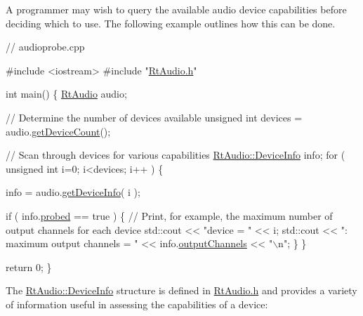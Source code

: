 A programmer may wish to query the available audio device capabilities before deciding which to use. The following example outlines how this can be done.


\begin{DoxyCode}
\textcolor{comment}{// audioprobe.cpp}

\textcolor{preprocessor}{#include <iostream>}
\textcolor{preprocessor}{#include "\hyperlink{_rt_audio_8h}{RtAudio.h}"}

\textcolor{keywordtype}{int} main()
\{
  \hyperlink{class_rt_audio}{RtAudio} audio;

  \textcolor{comment}{// Determine the number of devices available}
  \textcolor{keywordtype}{unsigned} \textcolor{keywordtype}{int} devices = audio.\hyperlink{class_rt_audio_a747ce2d73803641bbb66d6e78092aa1a}{getDeviceCount}();

  \textcolor{comment}{// Scan through devices for various capabilities}
  \hyperlink{struct_rt_audio_1_1_device_info}{RtAudio::DeviceInfo} info;
  \textcolor{keywordflow}{for} ( \textcolor{keywordtype}{unsigned} \textcolor{keywordtype}{int} i=0; i<devices; i++ ) \{

    info = audio.\hyperlink{class_rt_audio_a02d7ff44ad1d7eae22283a052f3dfda8}{getDeviceInfo}( i );

    \textcolor{keywordflow}{if} ( info.\hyperlink{struct_rt_audio_1_1_device_info_a97573717ccb1e75a834a0a108cd6982d}{probed} == \textcolor{keyword}{true} ) \{
      \textcolor{comment}{// Print, for example, the maximum number of output channels for each device}
      std::cout << \textcolor{stringliteral}{"device = "} << i;
      std::cout << \textcolor{stringliteral}{": maximum output channels = "} << info.\hyperlink{struct_rt_audio_1_1_device_info_a81aaf488f8158ef55b1bb678f66feb7d}{outputChannels} << \textcolor{stringliteral}{"\(\backslash\)n"};
    \}
  \}

  \textcolor{keywordflow}{return} 0;
\}
\end{DoxyCode}


The \hyperlink{struct_rt_audio_1_1_device_info}{Rt\+Audio\+::\+Device\+Info} structure is defined in \hyperlink{_rt_audio_8h}{Rt\+Audio.\+h} and provides a variety of information useful in assessing the capabilities of a device\+:


